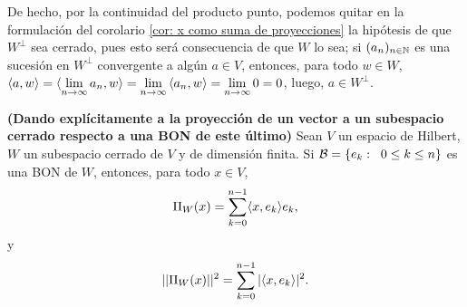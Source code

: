 \begin{nota}
De hecho, por la continuidad del producto punto, podemos
quitar en la formulación del corolario 
\ref{cor: x como suma de proyecciones}
la hipótesis de que $W^{\perp}$ sea cerrado, pues esto
será consecuencia de que $W$ lo sea; si $(a_{n})_{n \in \mathbb{N}}$
es una sucesión en $W^{\perp}$ convergente a algún $a \in V$,
entonces, para todo $w \in W$,
$\langle a, w \rangle = 
\langle \lim\limits_{n \rightarrow \infty}{a_{n}}, w \rangle
= \lim\limits_{n \rightarrow \infty}{\langle a_{n},w \rangle}=
\lim\limits_{n \rightarrow \infty}{0}=0$,
luego, $a \in W^{\perp}$.
\end{nota}


\begin{comment}
\begin{cor} \label{cor: proyeccion en terminos de una BON}
\TODO{Creo que debo quitar este.}
\textbf{(Dando explícitamente a la proyección de un vector
a un subespacio cerrado respecto a una BON de este último)}
Con la notación 
e hipótesis
de la proposición \ref{teo: Kol 6, p.149},
para todo $x \in V$
tenemos que
\[
\Pi_{W}(x) = \suma{k=1}{\infty}{ \langle x, e_{k} \rangle e_{k}},
\]
donde $W := \overline{\{e_{k}| k \in \IN \}}$. 
\end{cor}
\end{comment}

\begin{prop}
\label{cor: proyeccion en terminos de BON}
\textbf{(Dando explícitamente a la proyección de un vector
a un subespacio cerrado respecto a una BON de este último)}
Sean $V$ un espacio de Hilbert, $W$ un subespacio cerrado de $V$
y de dimensión finita. Si 
$\mathcal{B} = \{ e_{k}: \hspace{0.2cm} 0 \leq k \leq n \}$
es una BON de $W$, entonces, para todo $x \in V$,
\[
\Pi_{W}(x) = \sum\limits_{k=0}^{n-1} \langle x, e_{k} \rangle e_{k},
\]  
y
\[
|| \Pi_{W}(x) ||^{2} = \sum\limits_{k=0}^{n-1}|\langle x, e_{k} \rangle |^{2}.
\]
\end{prop}

\begin{comment}
\begin{cor} \label{cor: representacion de un vector respecto a una BON}
Si $V$ es un espacio con producto punto 
y $B=(e_{k})_{k \in \Delta}$ es una BON de este
a lo más numerable, entonces, para todo
$x \in V$, $x = \suma{k \in \Delta}{}{\langle x, e_{k} \rangle e_{k}}$
\end{cor}
\noindent
\textbf{Demostración.}
La proyección de un $x \in V$ sobre $V$ es trivialmente $x$
($x$ es el elemento de $V$ más cercano a sí mismo); según el corolario
\ref{cor: proyeccion en terminos de una BON}, esta
proyección es la serie propuesta. \QEDB
\vspace{0.2cm}
\end{comment}


